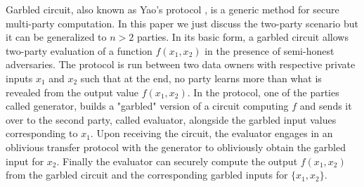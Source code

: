 Garbled circuit, also known as Yao's protocol \cite{Yao,yao2},  is a generic method for secure multi-party computation. In this paper we just discuss the two-party scenario but it can be generalized to $n > 2$ parties. In its basic form, a garbled circuit allows two-party evaluation of a function $f(x_1,x_2)$ in the presence of semi-honest adversaries. The protocol is run between two data owners with respective private inputs $x_1$ and $x_2$ such that at the end, no party learns more  
than what is revealed from the output value $f(x_1,x_2)$. In the protocol, one of the parties called
generator, builds a "garbled" version of a circuit computing $f$ and sends it over to the second party, called evaluator, alongside the garbled input values 
corresponding to $x_1$.  Upon receiving the circuit, the evaluator 
engages in an oblivious transfer protocol with the generator to obliviously obtain the garbled input for $x_2$. Finally the evaluator can securely compute the  output $f(x_1, x_2)$ from the garbled circuit and the corresponding garbled inputs for $\{x_1,x_2\}$.

